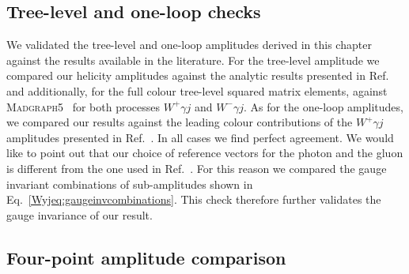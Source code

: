 \documentclass[main.tex]{subfiles}
\begin{document}


\subsection{Tree-level and one-loop checks}

We validated the tree-level and one-loop amplitudes derived in this chapter against the results available in the literature.
For the tree-level amplitude we compared our helicity amplitudes against the analytic results presented in Ref.~\cite{Campbell:2021mlr} and additionally, for the full colour tree-level squared matrix elements, against \textsc{Madgraph5}~\cite{Alwall:2014hca} for both processes $W^+\gamma j$ and $W^-\gamma j$.
As for the one-loop amplitudes, we compared our results against the leading colour contributions of the $W^+\gamma j$ amplitudes presented in Ref.~\cite{Campbell:2021mlr}.
In all cases we find perfect agreement.
We would like to point out that our choice of reference vectors for the photon and the gluon is different from the one used in Ref.~\cite{Campbell:2021mlr}. For this reason we compared the gauge invariant combinations of sub-amplitudes shown in Eq.~\eqref{Wyjeq:gaugeinvcombinations}. This check therefore further validates the gauge invariance of our result.


\subsection{Four-point amplitude comparison}
\label{subwyjsec:4ptcomparison}
\end{document}
